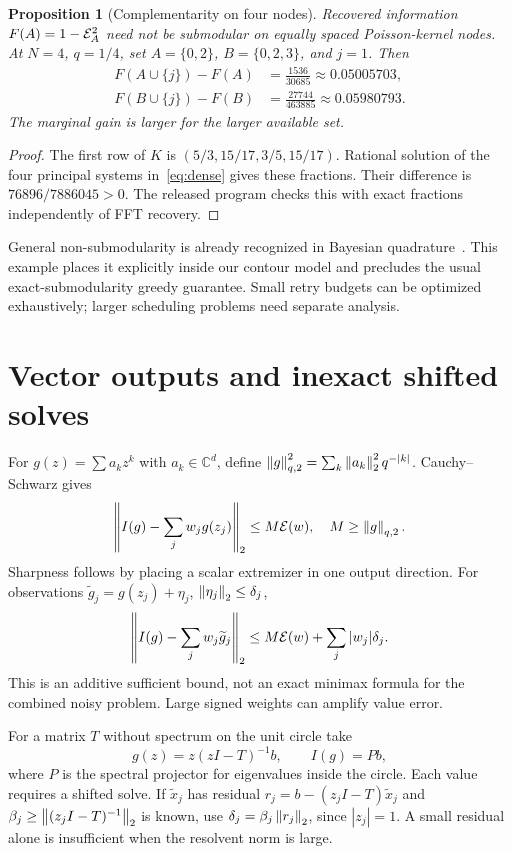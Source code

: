 \documentclass[11pt]{article}
\newtheorem{proposition}[theorem]{Proposition}
\begin{document}
\begin{proposition}[Complementarity on four nodes]\label{prop:nonmod}
Recovered information $F(A)=1-\mathcal E_A^2$ need not be submodular on equally spaced Poisson-kernel nodes. At $N=4$, $q=1/4$, set $A=\{0,2\}$, $B=\{0,2,3\}$, and $j=1$. Then
\begin{align}
F(A\cup\{j\})-F(A)&=\frac{1536}{30685}\approx0.05005703,\\
F(B\cup\{j\})-F(B)&=\frac{27744}{463885}\approx0.05980793.
\label{eq:counter}
\end{align}
The marginal gain is larger for the larger available set.
\end{proposition}
\begin{proof}
The first row of $K$ is $(5/3,15/17,3/5,15/17)$. Rational solution of the four principal systems in~\eqref{eq:dense} gives these fractions. Their difference is $76896/7886045>0$. The released program checks this with exact fractions independently of FFT recovery.
\end{proof}

General non-submodularity is already recognized in Bayesian quadrature~\cite{HD12}. This example places it explicitly inside our contour model and precludes the usual exact-submodularity greedy guarantee. Small retry budgets can be optimized exhaustively; larger scheduling problems need separate analysis.

\section{Vector outputs and inexact shifted solves}
For $g(z)=\sum a_kz^k$ with $a_k\in\mathbb C^d$, define
$\left\lVert g\right\rVert_{q,2}^2=\sum_k\left\lVert a_k\right\rVert_2^2q^{-|k|}$. Cauchy--Schwarz gives
\begin{equation}
\left\lVert I(g)-\sum_jw_jg(z_j)\right\rVert_2\le M\mathcal E(w),\quad M\ge\left\lVert g\right\rVert_{q,2}.
\label{eq:vector}
\end{equation}
Sharpness follows by placing a scalar extremizer in one output direction. For observations $\widetilde g_j=g(z_j)+\eta_j$, $\left\lVert\eta_j\right\rVert_2\le\delta_j$,
\begin{equation}
\left\lVert I(g)-\sum_jw_j\widetilde g_j\right\rVert_2
\le M\mathcal E(w)+\sum_j|w_j|\delta_j.
\label{eq:noise}
\end{equation}
This is an additive sufficient bound, not an exact minimax formula for the combined noisy problem. Large signed weights can amplify value error.

For a matrix $T$ without spectrum on the unit circle take
\begin{equation}
g(z)=z(zI-T)^{-1}b,\qquad I(g)=Pb,
\label{eq:projector}
\end{equation}
where $P$ is the spectral projector for eigenvalues inside the circle. Each value requires a shifted solve. If $\widetilde x_j$ has residual $r_j=b-(z_jI-T)\widetilde x_j$ and $\beta_j\ge\left\lVert(z_jI-T)^{-1}\right\rVert_2$ is known, use $\delta_j=\beta_j\left\lVert r_j\right\rVert_2$, since $|z_j|=1$. A small residual alone is insufficient when the resolvent norm is large.
\end{document}

